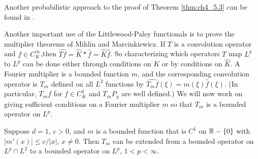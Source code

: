 Another probabilistic approach to the proof of Theorem \ref{thm:ch4_5.3} can be found in \cite{Bass1990}.



Another important use of the Littlewood-Paley functionals is to prove the multiplier theorems of Mihlin and Marcinkiewicz. If $T$ is a convolution operator and $f \in C_K^\infty$,then $\widehat{Tf} = \widehat{K} * \widehat{f} = \widehat{K}\widehat{f}$. So characterizing which operators $T$ map $L^p$ to $L^p$ can be done either through conditions on $K$ or by conditions on $\widehat{K}$. A Fourier multiplier is a bounded function $m$, and the corresponding convolution operator is $T_m$ defined on all $L^2$ functions by $\widehat{T_mf}(\xi) = m(\xi)\widehat{f}(\xi)$. (In particular, $T_mf$ for $f \in C_K^1$ and $T_mP_y$ are well defined.) We will now work on giving sufficient conditions on a Fourier multiplier $m$ so that $T_m$ is a bounded operator on $L^p$.

\begin{theorem}\label{thm:ch4_5.5}
Suppose $d=1$, $c > 0$, and $m$ is a bounded function that is $C^1$ on $\mathbb{R}-\{0\}$ with $|m'(x)| \leq c/|x|$, $x \neq 0$. Then $T_m$ can be extended from a bounded operator on $L^p\cap L^2$ to a bounded operator on $L^p$, $1 < p < \infty$.
\end{theorem}

